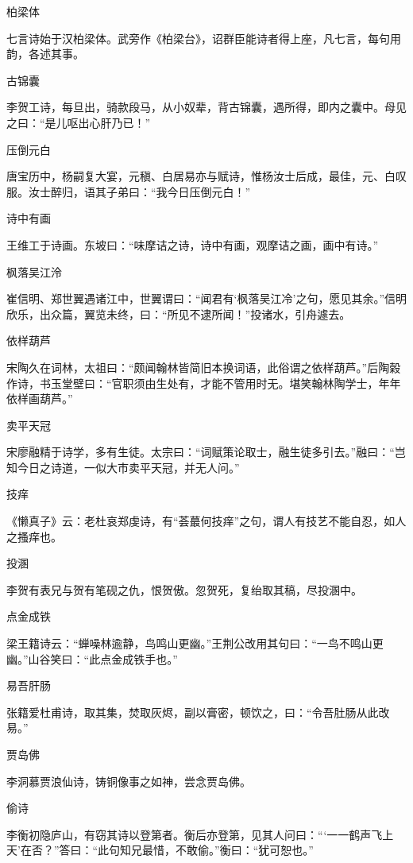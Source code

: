 \documentclass[a4paper,12pt,UTF8,twoside]{ctexbook}
\begin{document}
    柏梁体
    
    七言诗始于汉柏梁体。武旁作《柏梁台》，诏群臣能诗者得上座，凡七言，每句用韵，各述其事。
    
    古锦囊
    
    李贺工诗，每旦出，骑款段马，从小奴辈，背古锦囊，遇所得，即内之囊中。母见之曰：“是儿呕出心肝乃已！”
    
    压倒元白
    
    唐宝历中，杨嗣复大宴，元稹、白居易亦与赋诗，惟杨汝士后成，最佳，元、白叹服。汝士醉归，语其子弟曰：“我今日压倒元白！”
    
    诗中有画
    
    王维工于诗画。东坡曰：“味摩诘之诗，诗中有画，观摩诘之画，画中有诗。”
    
    枫落吴江泠
    
    崔信明、郑世翼遇诸江中，世翼谓曰：“闻君有‘枫落吴江冷’之句，愿见其余。”信明欣乐，出众篇，翼览未终，曰：“所见不逮所闻！”投诸水，引舟遽去。
    
    依样葫芦
    
    宋陶久在词林，太祖曰：“颇闻翰林皆简旧本换词语，此俗谓之依样葫芦。”后陶榖作诗，书玉堂壁曰：“官职须由生处有，才能不管用时无。堪笑翰林陶学士，年年依样画葫芦。”
    
    卖平天冠
    
    宋廖融精于诗学，多有生徒。太宗曰：“词赋策论取士，融生徒多引去。”融曰：“岂知今日之诗道，一似大市卖平天冠，并无人问。”
    
    技痒
    
    《懒真子》云：老杜哀郑虔诗，有“荟蕞何技痒”之句，谓人有技艺不能自忍，如人之搔痒也。
    
    投溷
    
    李贺有表兄与贺有笔砚之仇，恨贺傲。忽贺死，复绐取其稿，尽投溷中。
    
    点金成铁
    
    梁王籍诗云：“蝉噪林逾静，鸟鸣山更幽。”王荆公改用其句曰：“一鸟不鸣山更幽。”山谷笑曰：“此点金成铁手也。”
    
    易吾肝肠
    
    张籍爱杜甫诗，取其集，焚取灰烬，副以膏密，顿饮之，曰：“令吾肚肠从此改易。”
    
    贾岛佛
    
    李洞慕贾浪仙诗，铸铜像事之如神，尝念贾岛佛。
    
    偷诗
    
    李衡初隐庐山，有窃其诗以登第者。衡后亦登第，见其人问曰：“‘一一鹤声飞上天’在否？”答曰：“此句知兄最惜，不敢偷。”衡曰：“犹可恕也。”
    
\end{document}
